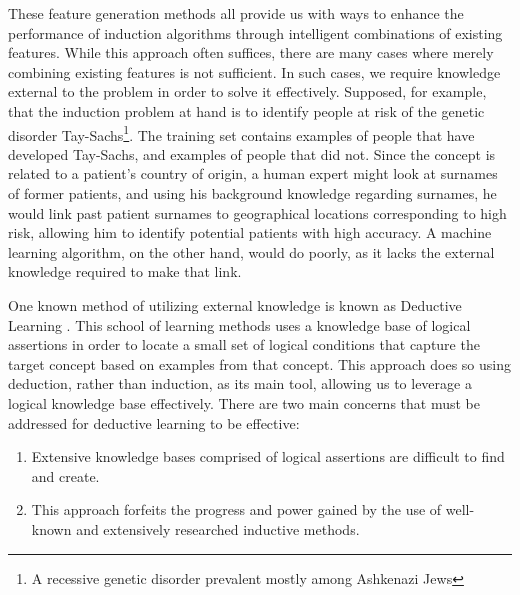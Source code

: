 \documentclass{article}
\theoremstyle{definition}
\begin{document}
These feature generation methods all provide us with ways to enhance the performance of induction algorithms through intelligent combinations of existing features. While this approach often suffices, there are many cases where merely combining existing features is not sufficient. 
In such cases, we require knowledge external to the problem in order to solve it effectively.
Supposed, for example, that the induction problem at hand is to identify people at risk of the genetic disorder Tay-Sachs\footnote{A recessive genetic disorder prevalent mostly among Ashkenazi Jews}. The training set contains examples of people that have developed Tay-Sachs, and examples of people that did not. Since the concept is related to a patient's country of origin, a human expert might look at surnames of former patients, and using his background knowledge regarding surnames, he would link past patient surnames to geographical locations corresponding to high risk, allowing him to identify potential patients with high accuracy.
A machine learning algorithm, on the other hand, would do poorly, as it lacks the external knowledge required to make that link.

One known method of utilizing external knowledge is known as Deductive Learning \citep{mitchell1982generalization,dejong1986explanation}. This school of learning methods uses a knowledge base of logical assertions in order to locate a small set of logical conditions that capture the target concept based on examples from that concept. This approach does so using deduction, rather than induction, as its main tool, allowing us to leverage a logical knowledge base effectively.
There are two main concerns that must be addressed for deductive learning to be effective:
\begin{enumerate}
	\item Extensive knowledge bases comprised of logical assertions are difficult to find and create.
	\item This approach forfeits the progress and power gained by the use of well-known and extensively researched inductive methods.
\end{enumerate}
\end{document}
